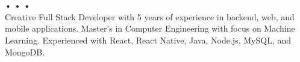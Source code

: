 \hspace*{1cm} \\ \vspace{5pt}
 \\ \vspace{5pt}
\href{tel:+1-872-258-5803}{\small{}}
\hspace{0.43em}•\hspace{0.43em}\href{mailto:ajoseph17@hawk.iit.edu}{\small{}}
\hspace{0.43em}•\hspace{0.43em}\href{https://www.linkedin.com/in/anselmj}{\small{}}
\hspace{0.43em}•\hspace{0.43em}\href{https://an23lm.github.io}{\small{}} \\ \vspace{10pt}
\small{Creative Full Stack Developer with 5 years of experience in backend, web, and mobile applications. Master's in Computer Engineering with focus on Machine Learning. Experienced with React, React Native, Java, Node.js, MySQL, and MongoDB.}
